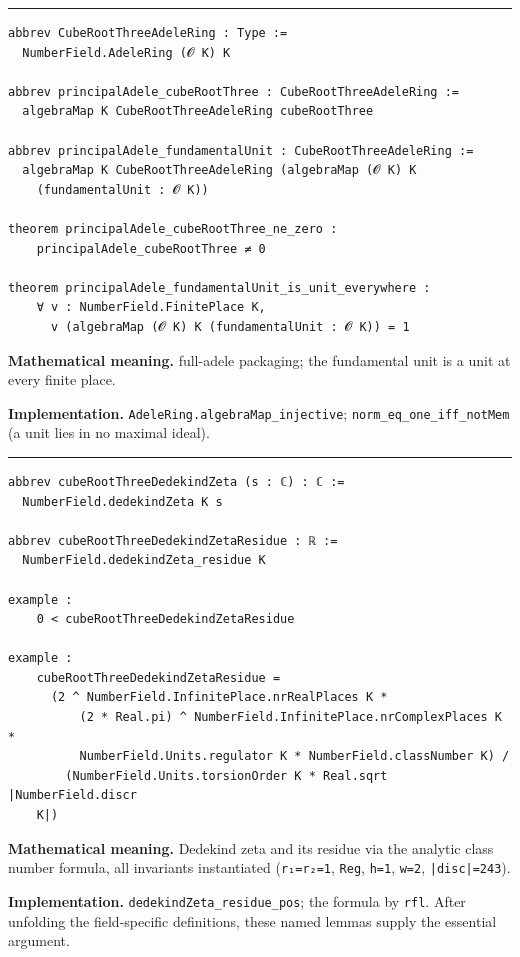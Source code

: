 \documentclass[UTF8,a4paper,11pt,fontset=fandol]{ctexart}
\theoremstyle{definition}
\newcommand{\statementsep}{\par\medskip\hrule\medskip}
\begin{document}
\statementsep
\begin{verbatim}
abbrev CubeRootThreeAdeleRing : Type :=
  NumberField.AdeleRing (𝓞 K) K

abbrev principalAdele_cubeRootThree : CubeRootThreeAdeleRing :=
  algebraMap K CubeRootThreeAdeleRing cubeRootThree

abbrev principalAdele_fundamentalUnit : CubeRootThreeAdeleRing :=
  algebraMap K CubeRootThreeAdeleRing (algebraMap (𝓞 K) K
    (fundamentalUnit : 𝓞 K))

theorem principalAdele_cubeRootThree_ne_zero :
    principalAdele_cubeRootThree ≠ 0

theorem principalAdele_fundamentalUnit_is_unit_everywhere :
    ∀ v : NumberField.FinitePlace K,
      v (algebraMap (𝓞 K) K (fundamentalUnit : 𝓞 K)) = 1
\end{verbatim}
\noindent\textbf{Mathematical meaning.} full-adele packaging; the fundamental unit is a unit at every finite place.\par
\noindent\textbf{Implementation.} \texttt{AdeleRing.\allowbreak{}algebraMap\_\allowbreak{}injective}; \texttt{norm\_\allowbreak{}eq\_\allowbreak{}one\_\allowbreak{}iff\_\allowbreak{}notMem} (a unit lies in no maximal ideal).\par
\statementsep
\begin{verbatim}
abbrev cubeRootThreeDedekindZeta (s : ℂ) : ℂ :=
  NumberField.dedekindZeta K s

abbrev cubeRootThreeDedekindZetaResidue : ℝ :=
  NumberField.dedekindZeta_residue K

example :
    0 < cubeRootThreeDedekindZetaResidue

example :
    cubeRootThreeDedekindZetaResidue =
      (2 ^ NumberField.InfinitePlace.nrRealPlaces K *
          (2 * Real.pi) ^ NumberField.InfinitePlace.nrComplexPlaces K *
          NumberField.Units.regulator K * NumberField.classNumber K) /
        (NumberField.Units.torsionOrder K * Real.sqrt |NumberField.discr
    K|)
\end{verbatim}
\noindent\textbf{Mathematical meaning.} Dedekind zeta and its residue via the analytic class number formula, all invariants instantiated (\texttt{r₁=r₂=1}, \texttt{Reg}, \texttt{h=1}, \texttt{w=2}, \texttt{|disc|=243}).\par
\noindent\textbf{Implementation.} \texttt{dedekindZeta\_\allowbreak{}residue\_\allowbreak{}pos}; the formula by \texttt{rfl}. After unfolding the field-specific definitions, these named lemmas supply the essential argument.\par
\end{document}
